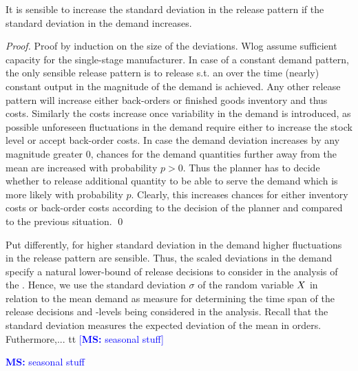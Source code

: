 \documentclass[mnsc]{informs3}
\newcommand\MS[2][r]{\ifx t#1 \textcolor{blue}{[\textbf{MS:} #2]}
  \else \begin{center}\textcolor{blue}{\textbf{MS:} #2} \end{center} \fi}
\begin{document}
\begin{lemma}

  It is sensible to increase the standard deviation in the release pattern if the standard deviation
  in the demand increases.

\end{lemma}

\begin{proof}{Proof by induction on the size of the deviations.}
  Wlog assume sufficient capacity for the single-stage manufacturer.
  In case of a constant
  demand pattern, the only sensible release pattern is to release s.t. an over the time (nearly)
  constant output in the magnitude of the demand is achieved.
  Any other release pattern will increase either back-orders or finished goods inventory and thus
  costs. Similarly the costs increase once variability in the demand is introduced, as possible
  unforeseen fluctuations in the demand require either to increase the stock level or accept
  back-order costs.
  In case the demand deviation increases by any magnitude greater $0$, chances for the demand
  quantities further away from the mean are increased with probability $p>0$. Thus the planner has
  to decide whether to release additional quantity to be able to serve the demand which is more
  likely with probability $p$. Clearly, this increases chances for either inventory costs or
  back-order costs according to the decision of the planner and compared to the previous situation.
  \qed




\end{proof}


Put differently, for higher standard deviation in the demand higher fluctuations in the release
pattern are sensible. Thus, the scaled deviations in the demand specify a natural lower-bound of
release decisions to consider in the analysis of the \LTS{}.
%
Hence, we use the standard deviation $\sigma$ of the random variable $X$ in relation to the mean
demand as measure for determining the time span of the release decisions and \WIP{}-levels being
considered in the analysis. Recall that the standard deviation measures the expected deviation of
the mean in orders.
%
%
%
Futhermore,... \MS[t]{seasonal stuff}
%
\end{document}
